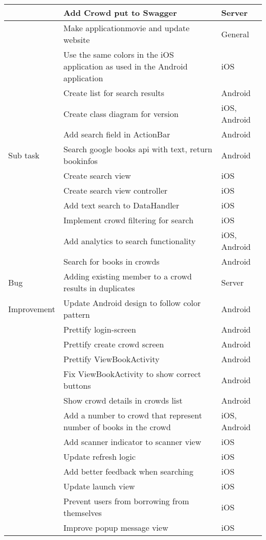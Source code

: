 \begin{longtable}{|L{2cm}|L{10cm}|L{3cm}|}
 \hline
 & Add Crowd put to Swagger & Server \\
 \hline
 & Make applicationmovie and update website & General \\
 \hline
 & Use the same colors in the iOS application as used in the Android application & iOS \\
 \hline
 & Create list for search results & Android \\
 \hline
 & Create class diagram for version & iOS, Android \\
 \hline
 & Add search field in ActionBar & Android \\
 \hline
Sub task & Search google books api with text, return bookinfos & Android \\
\hline
 & Create search view & iOS \\
 \hline
 & Create search view controller & iOS \\
 \hline
 & Add text search to DataHandler & iOS \\
 \hline
 & Implement crowd filtering for search & iOS \\
 \hline
 & Add analytics to search functionality & iOS, Android \\
 \hline
 & Search for books in crowds & Android \\
 \hline
Bug & Adding existing member to a crowd results in duplicates & Server \\
\hline
Improvement & Update Android design to follow color pattern & Android \\
\hline
 & Prettify login-screen & Android \\
 \hline
 & Prettify create crowd screen & Android \\
 \hline
 & Prettify ViewBookActivity & Android \\
 \hline
 & Fix ViewBookActivity to show correct buttons & Android \\
 \hline
 & Show crowd details in crowds list & Android \\
 \hline
 & Add a number to crowd that represent number of books in the crowd & iOS, Android \\
 \hline
 & Add scanner indicator to scanner view & iOS \\
 \hline
 & Update refresh logic & iOS \\
 \hline
 & Add better feedback when searching & iOS \\
 \hline
 & Update launch view & iOS \\
 \hline
 & Prevent users from borrowing from themselves & iOS \\
 \hline
 & Improve popup message view & iOS \\
 \hline
\end{longtable}